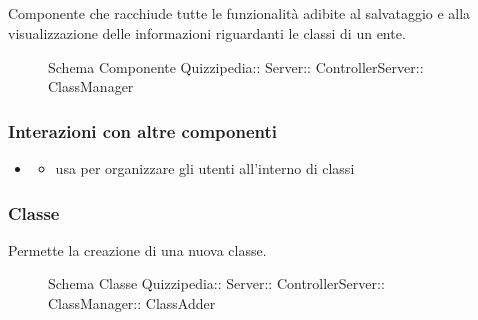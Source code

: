 \subsection{}
Componente che racchiude tutte le funzionalità adibite al salvataggio e alla visualizzazione delle informazioni riguardanti le classi di un ente.
\begin{figure}[H]
\centering
\noindent{}
\caption[Schema Componente ClassManager]{Schema Componente Quizzipedia:: Server:: ControllerServer:: ClassManager}
\end{figure}
\subsubsection{Interazioni con altre componenti}
\begin{itemize}
\item {}
\begin{itemize}
\item usa  per organizzare gli utenti all'interno di classi
\end{itemize}
\end{itemize}
\subsubsection{Classe }
Permette la creazione di una nuova classe.
\begin{figure}[H]
\centering
\noindent{}
\caption[Schema Classe ClassAdder]{Schema Classe Quizzipedia:: Server:: ControllerServer:: ClassManager:: ClassAdder}
\end{figure}
